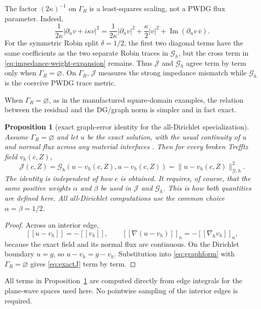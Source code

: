 \documentclass[pdflatex,sn-mathphys-num]{sn-jnl}
\theoremstyle{thmstyleone}
\newtheorem{proposition}[theorem]{Proposition}
\theoremstyle{thmstyletwo}
\newcommand{\jump}[1]{\left[\!\left[#1\right]\!\right]}
\newcommand{\jumpn}[1]{\left[\!\left[#1\right]\!\right]_{n}}
\begin{document}
The factor $(2\kappa)^{-1}$ on $\Gamma_R$ is a least-squares scaling, not a PWDG flux parameter.  Indeed,
\begin{equation}\label{eq:impedance-weight-expansion}
 \frac{1}{2\kappa}|\partial_n v+i\kappa v|^2
 =\frac{1}{2\kappa}|\partial_n v|^2
 +\frac{\kappa}{2}|v|^2
 +\operatorname{Im}(\partial_n v\,\overline v).
\end{equation}
For the symmetric Robin split $\delta=1/2$, the first two diagonal terms have the same coefficients as the two separate Robin traces in $\mathcal G_h$, but the cross term in \eqref{eq:impedance-weight-expansion} remains.  Thus $\mathcal J$ and $\mathcal G_h$ agree term by term only when $\Gamma_R=\varnothing$.  On $\Gamma_R$, $\mathcal J$ measures the strong impedance mismatch while $\mathcal G_h$ is the coercive PWDG trace metric.

When $\Gamma_R=\varnothing$, as in the manufactured square-domain examples, the relation between the residual and the DG/graph norm is simpler and in fact exact.

\begin{proposition}[exact graph-error identity for the all-Dirichlet specialization]\label{prop:exactJ}
Assume $\Gamma_R=\varnothing$ and let $u$ be the exact solution, with the usual continuity of $u$ and normal flux across any material interfaces \cite{MoiolaSpence2019}.  Then for every broken Trefftz field $v_h(c,Z)$,
\begin{equation}\label{eq:exactJ}
 {\mathcal J(c,Z)=\mathcal G_h(u-v_h(c,Z),u-v_h(c,Z))
 =\|u-v_h(c,Z)\|_{\mathcal G,h}^2.}
\end{equation}
The identity is independent of how $c$ is obtained.  It requires, of course, that the same positive weights $\alpha$ and $\beta$ be used in $\mathcal J$ and $\mathcal G_h$.  This is how both quantities are defined here.  All all-Dirichlet computations use the common choice $\alpha=\beta=1/2$.
\end{proposition}
\begin{proof}
Across an interior edge,
\[
 \jump{u-v_h}=-\jump{v_h},\qquad
 \jumpn{\nabla(u-v_h)}=-\jumpn{\nabla_hv_h},
\]
because the exact field and its normal flux are continuous.  On the Dirichlet boundary $u=g$, so $u-v_h=g-v_h$.  Substitution into \eqref{eq:graphform} with $\Gamma_R=\varnothing$ gives \eqref{eq:exactJ} term by term.
\end{proof}

All terms in Proposition~\ref{prop:exactJ} are computed directly from edge integrals for the plane-wave spaces used here.  No pointwise sampling of the interior edges is required.
\end{document}
